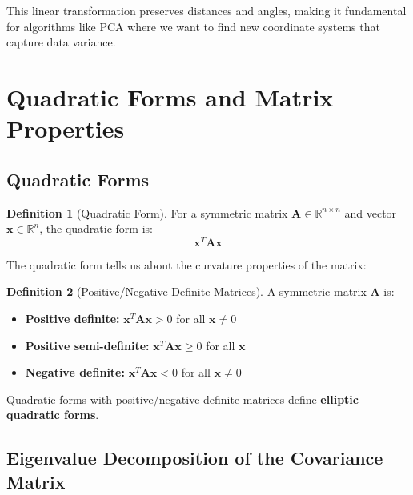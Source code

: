 \documentclass[12pt,a4paper]{article}
\theoremstyle{definition}
\newtheorem{definition}{Definition}[section]
\begin{document}
This linear transformation preserves distances and angles, making it fundamental for algorithms like PCA where we want to find new coordinate systems that capture data variance.

\newpage


\section{Quadratic Forms and Matrix Properties}

\subsection{Quadratic Forms}

\begin{definition}[Quadratic Form]
For a symmetric matrix $\mathbf{A} \in \mathbb{R}^{n \times n}$ and vector $\mathbf{x} \in \mathbb{R}^n$, the quadratic form is:
\[
\mathbf{x}^T \mathbf{A} \mathbf{x}
\]
\end{definition}

The quadratic form tells us about the curvature properties of the matrix:

\begin{definition}[Positive/Negative Definite Matrices]
A symmetric matrix $\mathbf{A}$ is:
\begin{itemize}
    \item \textbf{Positive definite:} $\mathbf{x}^T \mathbf{A} \mathbf{x} > 0$ for all $\mathbf{x} \neq 0$
    \item \textbf{Positive semi-definite:} $\mathbf{x}^T \mathbf{A} \mathbf{x} \geq 0$ for all $\mathbf{x}$
    \item \textbf{Negative definite:} $\mathbf{x}^T \mathbf{A} \mathbf{x} < 0$ for all $\mathbf{x} \neq 0$
\end{itemize}
\end{definition}

Quadratic forms with positive/negative definite matrices define \textbf{elliptic quadratic forms}.

\subsection{Eigenvalue Decomposition of the Covariance Matrix}
\end{document}
